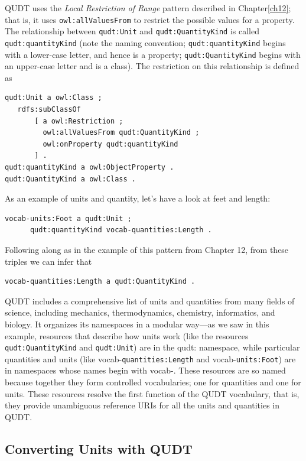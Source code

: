 QUDT uses the \emph{Local Restriction of Range} pattern described in Chapter\ref{ch12}; that is, it uses
\texttt{owl:allValuesFrom} to restrict the possible values for a property. The
relationship between \texttt{qudt:Unit} and \texttt{qudt:QuantityKind} is called
\texttt{qudt:quantityKind} (note the naming convention; \texttt{qudt:quantityKind} begins
with a lower-case letter, and hence is a property; \texttt{qudt:QuantityKind}
begins with an upper-case letter and is a class). The restriction on
this relationship is defined as

\begin{lstlisting}
qudt:Unit a owl:Class ;
   rdfs:subClassOf
       [ a owl:Restriction ;
         owl:allValuesFrom qudt:QuantityKind ;
         owl:onProperty qudt:quantityKind
       ] .
qudt:quantityKind a owl:ObjectProperty .
qudt:QuantityKind a owl:Class .
\end{lstlisting}


As an example of units and quantity, let's have a look at feet and
length:

\begin{lstlisting}
vocab-units:Foot a qudt:Unit ;
      qudt:quantityKind vocab-quantities:Length .
\end{lstlisting}

Following along as in the example of this pattern from Chapter 12, from
these triples we can infer that

\begin{lstlisting}
vocab-quantities:Length a qudt:QuantityKind .
\end{lstlisting}

QUDT includes a comprehensive list of units and quantities from many
fields of science, including mechanics, thermodynamics, chemistry,
informatics, and biology. It organizes its namespaces in a modular
way---as we saw in this example, resources that describe how units work
(like the resources \texttt{qudt:QuantityKind} and \texttt{qudt:Unit}) are in the qudt:
namespace, while particular quantities and units (like
vocab-\texttt{quantities:Length} and vocab-\texttt{units:Foot}) are in namespaces whose
names begin with vocab-. These resources are so named because together
they form controlled vocabularies; one for quantities and one for units.
These resources resolve the first function of the QUDT vocabulary, that
is, they provide unambiguous reference URIs for all the units and
quantities in QUDT.

\subsection{Converting Units with QUDT}

